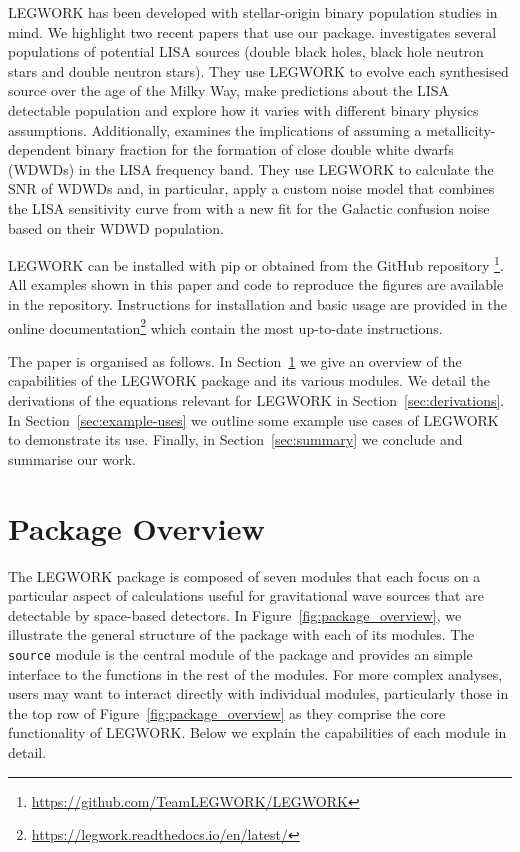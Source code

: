 \documentclass[twocolumn, linenumbers]{aastex631}
\newcommand{\lw}{LEGWORK}
\newcommand{\lwColour}{SeaGreen}
\begin{document}
\lw{} has been developed with stellar-origin binary population studies in mind. We highlight two recent papers that use our package. \citet{Wagg+2021} investigates several populations of potential LISA sources (double black holes, black hole neutron stars and double neutron stars). They use \lw{} to evolve each synthesised source over the age of the Milky Way, make predictions about the LISA detectable population and explore how it varies with different binary physics assumptions. Additionally, \citet{Thiele+2021} examines the implications of assuming a metallicity-dependent binary fraction for the formation of close double white dwarfs (WDWDs) in the LISA frequency band. They use \lw{} to calculate the SNR of WDWDs and, in particular, apply a custom noise model that combines the LISA sensitivity curve from \citet{Robson+2019} with a new fit for the Galactic confusion noise based on their WDWD population.

\lw{} can be installed with pip or obtained from the GitHub repository \href{https://github.com/TeamLEGWORK/LEGWORK}{\color{\lwColour}\faGithub}\footnote{\url{https://github.com/TeamLEGWORK/LEGWORK}}. All examples shown in this paper and code to reproduce the figures are available in the repository. Instructions for installation and basic usage are provided in the online documentation\footnote{\url{https://legwork.readthedocs.io/en/latest/}} which contain the most up-to-date instructions.

The paper is organised as follows. In Section~\ref{sec:LEGWORK-overview} we give an overview of the capabilities of the \lw{} package and its various modules. We detail the derivations of the equations relevant for \lw{} in Section~\ref{sec:derivations}. In Section~\ref{sec:example-uses} we outline some example use cases of \lw{} to demonstrate its use. Finally, in Section~\ref{sec:summary} we conclude and summarise our work.

\section{Package Overview}\label{sec:LEGWORK-overview}

The \lw{} package is composed of seven modules that each focus on a particular aspect of calculations useful for gravitational wave sources that are detectable by space-based detectors. In Figure~\ref{fig:package_overview}, we illustrate the general structure of the package with each of its modules. The \texttt{source} module is the central module of the package and provides an simple interface to the functions in the rest of the modules. For more complex analyses, users may want to interact directly with individual modules, particularly those in the top row of Figure~\ref{fig:package_overview} as they comprise the core functionality of \lw{}. Below we explain the capabilities of each module in detail.
\end{document}

